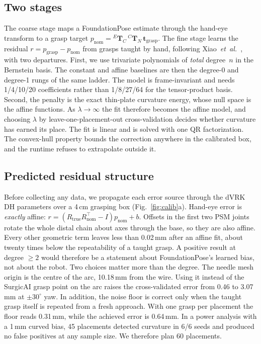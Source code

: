 \documentclass[letterpaper, 10 pt, conference]{ieeeconf}  %
\begin{document}
\subsection{Two stages}
The coarse stage maps a FoundationPose estimate through the hand-eye transform
to a grasp target $p_{\mathrm{nom}}={}^{E}\mathbf{T}_{C}\,{}^{C}\mathbf{T}_{N}\,
\mathbf{t}_{\mathrm{grasp}}$. The fine stage learns the residual
$r=p_{\mathrm{grasp}}-p_{\mathrm{nom}}$ from grasps taught by hand, following
Xiao~\emph{et~al.}~\cite{xiao2022delta}, with two departures. First, we use
trivariate polynomials of \emph{total} degree~$n$ in the Bernstein basis. The
constant and affine baselines are then the degree-0 and degree-1 rungs of the
same ladder. The model is frame-invariant and needs 1/4/10/20 coefficients
rather than 1/8/27/64 for the tensor-product basis. Second, the penalty is the
exact thin-plate curvature energy, whose null space is the affine functions. As
$\lambda\to\infty$ the fit therefore becomes the affine model, and choosing
$\lambda$ by leave-one-placement-out cross-validation decides whether curvature
has earned its place. The fit is linear and is solved with one QR
factorization. The convex-hull property bounds the correction anywhere in the
calibrated box, and the runtime refuses to extrapolate outside it.

\subsection{Predicted residual structure}
Before collecting any data, we propagate each error source through the dVRK DH
parameters over a 4\,cm grasping box (Fig.~\ref{fig:calib}a). Hand-eye error is
\emph{exactly} affine: $r=(R_{\mathrm{true}}R_{\mathrm{nom}}^{\top}-I)p_{\mathrm{nom}}+b$.
Offsets in the first two PSM joints rotate the whole distal chain about axes
through the base, so they are also affine. Every other geometric term leaves
less than 0.02\,mm after an affine fit, about twenty times below the
repeatability of a taught grasp. A positive result at degree $\geq2$ would
therefore be a statement about FoundationPose's learned bias, not about the
robot. Two choices matter more than the degree. The needle mesh origin is the
centre of the arc, 10.18\,mm from the wire. Using it instead of the SurgicAI
grasp point on the arc raises the cross-validated error from 0.46 to 3.07\,mm at
$\pm30^\circ$ yaw. In addition, the noise floor is correct only when the taught
grasp itself is repeated from a fresh approach. With one grasp per placement the
floor reads 0.31\,mm, while the achieved error is 0.64\,mm. In a power analysis
with a 1\,mm curved bias, 45 placements detected curvature in 6/6 seeds and
produced no false positives at any sample size. We therefore plan 60 placements.
\end{document}
